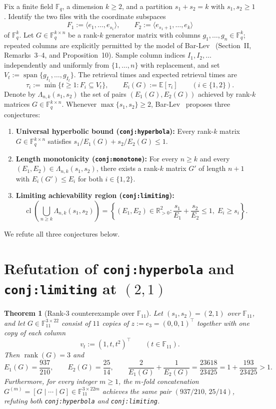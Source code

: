 \documentclass[11pt]{article}
\theoremstyle{plain}
\newtheorem{theorem}{Theorem}
\theoremstyle{definition}
\theoremstyle{remark}
\DeclareMathOperator{\rank}{rank}
\DeclareMathOperator{\spn}{span}
\DeclareMathOperator{\cl}{cl}
\begin{document}
Fix a finite field $\mathbb{F}_q$, a dimension $k \ge 2$, and a partition $s_1 + s_2 = k$ with $s_1, s_2 \ge 1$.
Identify the two files with the coordinate subspaces
\[
F_1 := \langle e_1, \dots, e_{s_1} \rangle, \qquad
F_2 := \langle e_{s_1 + 1}, \dots, e_k \rangle
\]
of $\mathbb{F}_q^k$.
Let $G \in \mathbb{F}_q^{k \times n}$ be a rank-$k$ generator matrix with columns $g_1, \dots, g_n \in \mathbb{F}_q^k$; repeated columns are explicitly permitted by the model of Bar-Lev~\cite{BarLev2026} (Section~II, Remarks~3--4, and Proposition~10).
Sample column indices $I_1, I_2, \dots$ independently and uniformly from $\{1, \dots, n\}$ with replacement, and set $V_t := \spn\{g_{I_1}, \dots, g_{I_t}\}$.
The retrieval times and expected retrieval times are
\[
\tau_i := \min\{t \ge 1 : F_i \subseteq V_t\}, \qquad
E_i(G) := \mathbb{E}[\tau_i] \qquad (i \in \{1, 2\}).
\]
Denote by $\Lambda_{n,k}(s_1, s_2)$ the set of pairs $(E_1(G), E_2(G))$ achieved by rank-$k$ matrices $G \in \mathbb{F}_q^{k \times n}$.
Whenever $\max\{s_1, s_2\} \ge 2$, Bar-Lev~\cite{BarLev2026} proposes three conjectures:
\begin{enumerate}[label=\textup{(\arabic*)}]
\item \textbf{Universal hyperbolic bound (\texttt{conj:hyperbola}):} Every rank-$k$ matrix $G \in \mathbb{F}_q^{k \times n}$ satisfies $s_1/E_1(G) + s_2/E_2(G) \le 1$.
\item \textbf{Length monotonicity (\texttt{conj:monotone}):} For every $n \ge k$ and every $(E_1, E_2) \in \Lambda_{n,k}(s_1, s_2)$, there exists a rank-$k$ matrix $G'$ of length $n + 1$ with $E_i(G') \le E_i$ for both $i \in \{1, 2\}$.
\item \textbf{Limiting achievability region (\texttt{conj:limiting}):}
\[
\cl\!\left(\bigcup_{n \ge k} \Lambda_{n,k}(s_1, s_2)\right)
= \left\{(E_1, E_2) \in \mathbb{R}_{>0}^2 : \frac{s_1}{E_1} + \frac{s_2}{E_2} \le 1,\; E_i \ge s_i\right\}.
\]
\end{enumerate}
We refute all three conjectures below.

\section{Refutation of \texttt{conj:hyperbola} and \texttt{conj:limiting} at \texorpdfstring{$(2,1)$}{(2,1)}}

\begin{theorem}[Rank-$3$ counterexample over $\mathbb{F}_{11}$]\label{thm:gf11}
Let $(s_1, s_2) = (2, 1)$ over $\mathbb{F}_{11}$, and let $G \in \mathbb{F}_{11}^{3 \times 22}$ consist of $11$ copies of $z := e_3 = (0,0,1)^\top$ together with one copy of each column
\[
v_t := (1, t, t^2)^\top \qquad (t \in \mathbb{F}_{11}).
\]
Then $\rank(G) = 3$ and
\[
E_1(G) = \frac{937}{210}, \qquad
E_2(G) = \frac{25}{14}, \qquad
\frac{2}{E_1(G)} + \frac{1}{E_2(G)} = \frac{23618}{23425} = 1 + \frac{193}{23425} > 1.
\]
Furthermore, for every integer $m \ge 1$, the $m$-fold concatenation $G^{(m)} = [G \mid \cdots \mid G] \in \mathbb{F}_{11}^{3 \times 22m}$ achieves the same pair $(937/210,\, 25/14)$, refuting both \texttt{conj:hyperbola} and \texttt{conj:limiting}.
\end{theorem}
\end{document}
